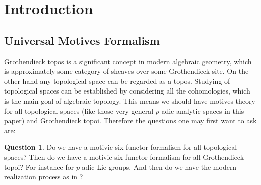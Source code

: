 \documentclass[12pt]{article}
\theoremstyle{definition}
\newtheorem{question}{Question}
\begin{document}
\newpage
\tableofcontents


\newpage
\section{Introduction}

\subsection{Universal Motives Formalism}

Grothendieck topos is a significant concept in modern algebraic geometry, which is approximately some category of sheaves over some Grothendieck site. On the other hand any topological space can be regarded as a topos. Studying of topological spaces can be established by considering all the cohomologies, which is the main goal of algebraic topology. This means we should have motives theory for all topological spaces (like those very general $p$-adic analytic spaces in this paper) and Grothendieck topoi. Therefore the questions one may first want to ask are:

\begin{question}
Do we have a motivic six-functor formalism for all topological spaces? Then do we have a motivic six-functor formalism for all Grothendieck topoi? For instance for $p$-adic Lie groups. And then do we have the modern realization process as in \cite{5S4}?
\end{question}
\end{document}
